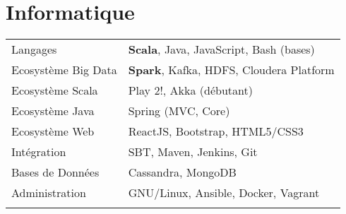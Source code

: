 \documentclass[11pt,a4paper]{moderncv}
\begin{document}
\section{Informatique}
\begin{tabular}{ll}
  \vspace{0.1cm}
  \hspace{0.1cm} Langages & \hspace{0.5cm} \textbf{Scala}, Java, JavaScript, Bash (bases) \\ \vspace{0.1cm}
  \hspace{0.1cm} Ecosystème Big Data & \hspace{0.5cm} \textbf{Spark}, Kafka, HDFS, Cloudera Platform \\ \vspace{0.1cm}
  \hspace{0.1cm} Ecosystème Scala & \hspace{0.5cm} Play 2!, Akka (débutant) \\ \vspace{0.1cm}
  \hspace{0.1cm} Ecosystème Java & \hspace{0.5cm} Spring (MVC, Core) \\ \vspace{0.1cm}
  \hspace{0.1cm} Ecosystème Web & \hspace{0.5cm} ReactJS, Bootstrap, HTML5/CSS3 \\ \vspace{0.1cm}
  \hspace{0.1cm} Intégration & \hspace{0.5cm} SBT, Maven, Jenkins, Git \\ \vspace{0.1cm}
  \hspace{0.1cm} Bases de Données & \hspace{0.5cm} Cassandra, MongoDB \\ \vspace{0.1cm}
  \hspace{0.1cm} Administration & \hspace{0.5cm} GNU/Linux, Ansible, Docker, Vagrant \\ \vspace{0.1cm}
\end{tabular}



\newpage
\end{document}
